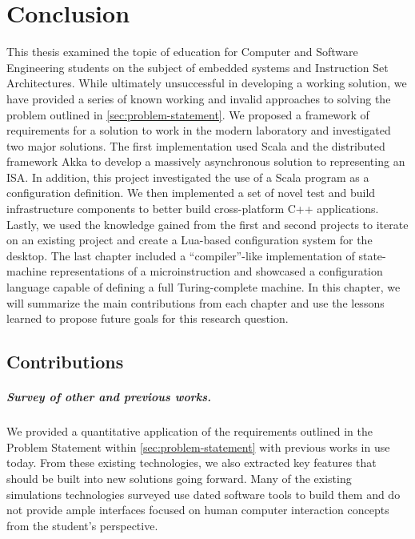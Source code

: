 \chapter{Conclusion}
\label{ch:conclusion}

This thesis examined the topic of education for Computer and Software Engineering students on the subject of embedded systems and Instruction Set Architectures. While ultimately unsuccessful in developing a working solution, we have provided a series of known working and invalid approaches to solving the problem outlined in \cref{sec:problem-statement}. We proposed a framework of requirements for a solution to work in the modern laboratory and investigated two major solutions. The first implementation used Scala and the distributed framework Akka to develop a massively asynchronous solution to representing an ISA. In addition, this project investigated the use of a Scala program as a configuration definition. We then implemented a set of novel test and build infrastructure components to better build cross-platform C++ applications. Lastly, we used the knowledge gained from the first and second projects to iterate on an existing project and create a Lua-based configuration system for the desktop. The last chapter included a ``compiler''-like implementation of state-machine representations of a microinstruction and showcased a configuration language capable of defining a full Turing-complete machine. In this chapter, we will summarize the main contributions from each chapter and use the lessons learned to propose future goals for this research question. 

\section{Contributions}

\paragraph{Survey of other and previous works.} We provided a quantitative application of the requirements outlined in the Problem Statement within \cref{sec:problem-statement} with previous works in use today. From these existing technologies, we also extracted key features that should be built into new solutions going forward. Many of the existing simulations technologies surveyed use dated software tools to build them and do not provide ample interfaces focused on human computer interaction concepts from the student's perspective. 

